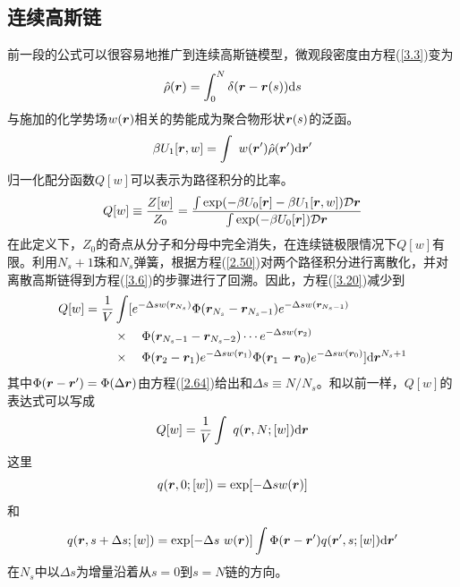 \subsection{连续高斯链}
前一段的公式可以很容易地推广到连续高斯链模型，微观段密度由方程(\ref{3.3})变为
\begin{equation}\label{3.18}
\hat{\rho}(\bm{r})=\int_0^N\delta(\bm{r}-\bm{r}(s))\mathrm{d}s
\end{equation}
与施加的化学势场$w(\bm{r})$相关的势能成为聚合物形状$\bm{r}(s)$的泛函。
\begin{equation}\label{3.19}
\beta U_1[\bm{r},w]=\int~w(\bm{r}')\hat{\rho}(\bm{r}')\mathrm{d}\bm{r}'
\end{equation}
归一化配分函数$Q[w]$可以表示为路径积分的比率。
\begin{equation}\label{3.20}
Q[w]\equiv\frac{Z[w]}{Z_0}=\frac{\int\exp(-\beta U_0[\bm{r}]-\beta U_1[\bm{r},w])\mathcal{D}\bm{r}}{\int\exp(-\beta U_0[\bm{r}])\mathcal{D}\bm{r}}
\end{equation}
在此定义下，$Z_0$的奇点从分子和分母中完全消失，在连续链极限情况下$Q[w]$有限。利用$N_s+1$珠和$N_s$弹簧，根据方程(\ref{2.50})对两个路径积分进行离散化，并对离散高斯链得到方程(\ref{3.6})的步骤进行了回溯。因此，方程(\ref{3.20})减少到
\begin{equation}\label{3.21}
\begin{aligned}
Q[w]=\frac{1}{V}&\int[e^{-\Delta sw(\bm{r}_{N_s})}\Phi(\bm{r}_{N_s}-\bm{r}_{N_s-1})e^{-\Delta sw(\bm{r}_{N_s-1})}\\
&\times\quad\Phi(\bm{r}_{N_s-1}-\bm{r}_{N_s-2})\cdots e^{-\Delta sw(\bm{r}_2)}\\
&\times\quad\Phi(\bm{r}_2-\bm{r}_1)e^{-\Delta sw(\bm{r}_1)}\Phi(\bm{r}_1-\bm{r}_0)e^{-\Delta sw(\bm{r}_0)}]\mathrm{d}\bm{r}^{N_s+1}
\end{aligned}
\end{equation}
其中$\Phi(\bm{r}-\bm{r}')=\Phi(\Delta\bm{r})$由方程(\ref{2.64})给出和$\Delta s\equiv N/N_s$。和以前一样，$Q[w]$的表达式可以写成
\begin{equation}\label{3.22}
Q[w]=\frac{1}{V}\int~q(\bm{r},N;[w])\mathrm{d}\bm{r}
\end{equation}
这里
\begin{equation}\label{3.23}
q(\bm{r},0;[w])=\exp[-\Delta sw(\bm{r})]
\end{equation}
和
\begin{equation}\label{3.24}
q(\bm{r},s+\Delta s;[w])=\exp[-\Delta s~w(\bm{r})]\int\Phi(\bm{r}-\bm{r}')q(\bm{r}',s;[w])\mathrm{d}\bm{r}'
\end{equation}
在$N_s$中以$\Delta s$为增量沿着从$s=0$到$s=N$链的方向。

